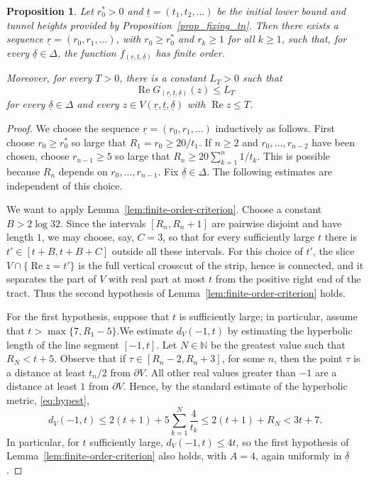 \documentclass[a4paper, 11pt, reqno]{amsart}
\numberwithin{equation}{section}
\theoremstyle{plain}
\newtheorem{proposition}[theorem]{Proposition}
\theoremstyle{remark}
\newcommand{\N}{{\mathbb{N}}}
\newcommand{\uldelta}{\underline{\delta}}
\newcommand{\ulr}{\underline{r}}
\newcommand{\ult}{\underline{t}}
\newcommand{\Rea}{\operatorname{Re }}
\begin{document}
\begin{proposition}\label{prop_fixing_rn}
	Let \(r_0^*>0\) and \(\ult=(t_1,t_2,\ldots)\) be the initial lower bound and tunnel heights provided by Proposition~\ref{prop_fixing_tn}. Then there exists a sequence \(\ulr=(r_0,r_1,\ldots)\), with \(r_0\ge r_0^*\) and \(r_k\ge1\) for all \(k\ge1\), such that, for every \(\uldelta\in\Delta\), the function \(f_{(\ulr,\ult,\uldelta)}\) has finite order.
	
	Moreover, for every \(T>0\), there is a constant \(L_T>0\) such that
	\[
	\Rea G_{(\ulr,\ult,\uldelta)}(z)\le L_T
	\]
	for every \(\uldelta\in\Delta\) and every
	\(z\in V(\ulr,\ult,\uldelta)\) with \(\Rea z\le T\).
\end{proposition}
\begin{proof}
We choose the sequence \(\ulr=(r_0,r_1,\ldots)\) inductively as follows. First choose \(r_0\ge r_0^*\) so large that \(R_1=r_0\ge20/t_1\). If \(n\ge2\) and \(r_0,\ldots,r_{n-2}\) have been chosen, choose \(r_{n-1}\ge5\) so large that \(R_n\ge 20\sum_{k=1}^n 1/t_k\). This is possible because \(R_n\) depends on \(r_0,\ldots,r_{n-1}\). Fix \(\uldelta\in\Delta\). The following estimates are independent of this choice.
	
	We want to apply Lemma~\ref{lem:finite-order-criterion}. Choose a constant \(B>2\log32\). Since the intervals $[R_n,R_n+1]$ are pairwise disjoint and have length $1$, we may choose, say, $C=3$, so that for every sufficiently large \(t\) there is \(t'\in[t+B,t+B+C]\) outside all these intervals. For this choice of \(t'\), the slice \(V\cap\{\Rea z=t'\}\) is the full vertical crosscut of the strip, hence is connected, and it separates the part of \(V\) with real part at most \(t\) from the positive right end of the tract. Thus the second hypothesis of Lemma~\ref{lem:finite-order-criterion} holds.
	
	For the first hypothesis, suppose that $t$ is sufficiently large; in particular, assume that $t>\max\{7,R_1-5\}$.We estimate \(d_V(-1,t)\) by estimating the hyperbolic length of the line segment \([-1,t]\). Let \(N\in\N\) be the greatest value such that \(R_N<t+5\). Observe that if \(\tau\in[R_n-2,R_n+3]\), for some \(n\), then the point \(\tau\) is a distance at least \(t_n/2\) from \(\partial V\). All other real values greater than \(-1\) are a distance at least \(1\) from \(\partial V\). Hence, by the standard estimate of the hyperbolic metric, \eqref{eq:hypest},
	\[
	d_V(-1,t)
	\leq 2(t+1)+5\sum_{k=1}^N\frac4{t_k}
	\leq 2(t+1)+R_N
	<3t+7.
	\]
	In particular, for \(t\) sufficiently large, \(d_V(-1,t)\le4t\), so the first hypothesis of Lemma~\ref{lem:finite-order-criterion} also holds, with $A=4$, again uniformly in \(\uldelta\).
	

\end{proof}
\end{document}
